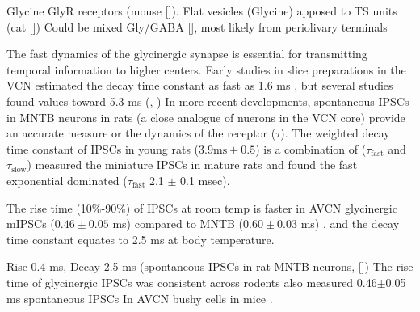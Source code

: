 Glycine GlyR receptors (mouse []).
Flat vesicles (Glycine) apposed to TS units (cat [])
Could be mixed Gly/GABA [], most likely from periolivary terminals

The fast dynamics of the glycinergic synapse is essential for transmitting
temporal information to higher centers.  Early studies in slice preparations in
the VCN estimated the decay time constant as fast as 1.6 ms
, but several studies found values toward 5.3 ms
(\citep*[mouse][]{OertelWickesberg:1993,WickesbergOertel:1993}, \citep*[guinea
pig VCN][]{HartyManis:1998}) In more recent developments, spontaneous IPSCs in
MNTB neurons in rats (a close analogue of nuerons in the VCN core) provide an
accurate measure or the dynamics of the receptor ($\tau$). The weighted decay
time constant of IPSCs in young rats ($3.9 \mathrm{ms} \pm 0.5$) is a
combination of ($\tau_{\textrm{fast}}$ and $\tau_{\textrm{slow}}$)
\citet{AwatramaniTurecekEtAl:2004} measured the miniature IPSCs in mature rats
and found the fast exponential dominated ($\tau_{\textrm{fast}}$ 2.1 $\pm$ 0.1
msec).  




The rise time (10\%-90\%) of IPSCs at room temp is faster in AVCN glycinergic mIPSCs
($0.46\pm0.05$ ms) compared to MNTB ($0.60\pm0.03$ ms) \citep{LimOleskevichEtAl:2003}, and the decay time constant equates to 2.5 ms at body temperature.

Rise 0.4 ms, Decay 2.5 ms (spontaneous IPSCs in rat MNTB neurons, []) 
The rise time of glycinergic IPSCs was consistent across rodents also measured 0.46$\pm$0.05 ms spontaneous IPSCs In
AVCN bushy cells in mice \citep{LimOleskevichEtAl:2003}.



